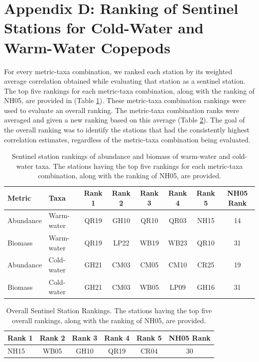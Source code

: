 \documentclass[preprint, authoryear, 12pt]{elsarticle}
\begin{document}
\clearpage
\setcounter{table}{0} 
\renewcommand{\thetable}{\small D.\arabic{table}}
\hypertarget{appendixD}{\section*{Appendix D: Ranking of Sentinel Stations for Cold-Water and Warm-Water Copepods}}

For every metric-taxa combination, we ranked each station by its weighted average correlation obtained while evaluating that station as a sentinel station. The top five rankings for each metric-taxa combination, along with the ranking of NH05, are provided in (Table \ref{tab:warmcold_rank}). These metric-taxa combination rankings were used to evaluate an overall ranking.  The metric-taxa combination ranks were averaged and given a new ranking based on this average (Table \ref{tab:all_rank}). The goal of the overall ranking was to identify the stations that had the consistently highest correlation estimates, regardless of the metric-taxa combination being evaluated.

\begin{table}[ht]
    \footnotesize
    \centering
    \begin{tabular}{llcccccc}
    \hline
    \hline
          Metric & Taxa & Rank 1 & Rank 2 & Rank 3 & Rank 4 & Rank 5 & NH05 Rank  \\
         \hline
         Abundance & Warm-water & QR19 & GH10 & QR10 & QR03 & NH15 & 14 \\
         Biomass & Warm-water & QR19 & LP22 & WB19 & WB23 & QR10 & 31 \\
         Abundance & Cold-water & GH21 & CM03 & CM05 & CM10 & CR25 & 19\\
         Biomass & Cold-water & GH21 & CM03 & WB05 & LP09 & GH16 & 31\\
         \hline
    \end{tabular}
    \caption{Sentinel station rankings of abundance and biomass of warm-water and cold-water taxa. The stations having the top five rankings for each metric-taxa combination, along with the ranking of NH05, are provided.}
    \label{tab:warmcold_rank}
\end{table}
\begin{table}[ht]
    \footnotesize
    \centering
    \begin{tabular}{lccccc}
    \hline
    \hline
         Rank 1 & Rank 2 & Rank 3 & Rank 4 & Rank 5 & NH05 Rank  \\
         \hline
         NH15 & WB05 & GH10 & QR19 & CR04 & 30 \\
         \hline
    \end{tabular}
    \caption{Overall Sentinel Station Rankings. The stations having the top five overall rankings, along with the ranking of NH05, are provided.}
    \label{tab:all_rank}
\end{table}
\end{document}
